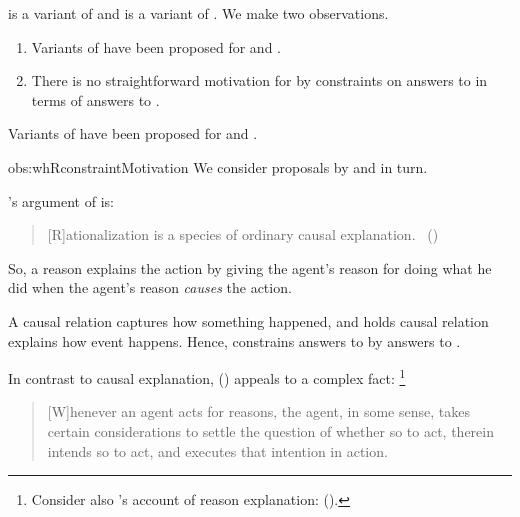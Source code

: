 \begin{note}
  \qWhyR{} is a variant of \qWhy{} and \qHowR{} is a variant of \qHow{}.
  We make two observations.

  \begin{enumerate}
  \item
    Variants of \issueInclusion{} have been proposed for \qWhyR{} and \qHow{}.
  \item
    There is no straightforward motivation for \issueInclusion{} by constraints on answers to \qWhyR{} in terms of answers to \qHow{}.
  \end{enumerate}
\end{note}

\begin{note}
  \begin{observation}%
    \label{obs:whRconstraintMotivation}%
    Variants of \issueInclusion{} have been proposed for \qWhyR{} and \qHow{}.
  \end{observation}
  \begin{motivation}{obs:whRconstraintMotivation}
    We consider proposals by \citeauthor{Davidson:1963aa} and \citeauthor{Hieronymi:2011aa} in turn.
    \medskip

    \noindent%
    \citeauthor{Davidson:1963aa}'s argument of  is:
    \begin{quote}
      [R]ationalization is a species of ordinary causal explanation.%
      \mbox{ }\hfill\mbox{(\citeyear[685]{Davidson:1963aa})}
    \end{quote}
    So, a reason explains the action by giving the agent's reason for doing what he did when the agent's reason \emph{causes} the action.

    A causal relation captures how something happened, and \citeauthor{Davidson:1963aa} holds causal relation explains how event happens.
    Hence, \citeauthor{Davidson:1963aa} constrains answers to \qWhyR{} by answers to \qHowR{}.
    \medskip

    \noindent%
    In contrast to causal explanation, \citeauthor{Hieronymi:2011aa} (\citeyear{Hieronymi:2011aa}) appeals to a complex fact:%
    \footnote{
      Consider also \citeauthor{Harman:1973ww}'s account of reason explanation:
       (\citeyear[52]{Harman:1973ww}).
    }
    \begin{quote}
      [W]henever an agent acts for reasons, the agent, in some sense, takes certain considerations to settle the question of whether so to act, therein intends so to act, and executes that intention in action.


\end{quote}
\end{motivation}
\end{note}
